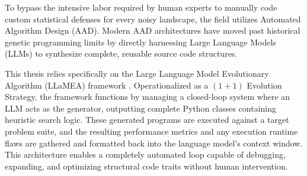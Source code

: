 To bypass the intensive labor required by human experts to manually code custom statistical defenses for every noisy landscape, the field utilizes Automated Algorithm Design (AAD). Modern AAD architectures have moved past historical genetic programming limits by directly harnessing Large Language Models (LLMs) to synthesize complete, reusable source code structures. 

This thesis relies specifically on the Large Language Model Evolutionary Algorithm (LLaMEA) framework \cite{LLaMEA2024}. Operationalized as a $(1+1)$ Evolution Strategy, the framework functions by managing a closed-loop system where an LLM acts as the generator, outputting complete Python classes containing heuristic search logic. These generated programs are executed against a target problem suite, and the resulting performance metrics and any execution runtime flaws are gathered and formatted back into the language model's context window. This architecture enables a completely automated loop capable of debugging, expanding, and optimizing structural code traits without human intervention.